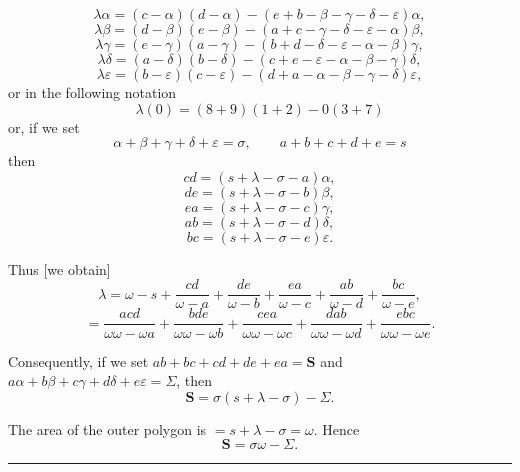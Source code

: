 
\[
\lambda\alpha=(c-\alpha)(d-\alpha)-(e+b-\beta-\gamma-\delta-\varepsilon)\alpha,
\]
\[
\lambda \beta=(d-\beta)(e-\beta)-(a+c-\gamma-\delta-\varepsilon-\alpha)\beta,
\]
\[
\lambda \gamma=(e-\gamma)(a-\gamma)-(b+d-\delta-\varepsilon-\alpha-\beta)\gamma,
\]
\[
\lambda \delta=(a-\delta)(b-\delta)-(c+e-\varepsilon-\alpha-\beta-\gamma)\delta,
\]
\[
\lambda \varepsilon=(b-\varepsilon)(c-\varepsilon)-(d+a-\alpha-\beta-\gamma-\delta)\varepsilon,
\]
or in the following notation
\[
\lambda(0)=(8+9)(1+2)-0(3+7)
\]
or, if we set
\[
\alpha+\beta+\gamma+\delta+\varepsilon=\sigma, \qquad a+b+c+d+e=s
\]
then
\[
cd=(s+\lambda-\sigma-a)\alpha,
\]
\[
de=(s+\lambda-\sigma-b)\beta,
\]
\[
ea=(s+\lambda-\sigma-c)\gamma,
\]
\[
ab=(s+\lambda-\sigma-d)\delta,
\]
\[
bc=(s+\lambda-\sigma-e)\varepsilon.
\]

Thus [we obtain]
\[
\lambda=\omega-s+\frac{cd}{\omega-a}+\frac{de}{\omega-b}+\frac{ea}{\omega-c}+\frac{ab}{\omega-d}+\frac{bc}{\omega-e},
\]
\[
=\frac{acd}{\omega\omega-\omega a}+\frac{bde}{\omega\omega-\omega b}+\frac{cea}{\omega\omega-\omega c}+\frac{dab}{\omega\omega-\omega d}+\frac{ebc}{\omega\omega-\omega e}.
\]

Consequently, if we set $ab+bc+cd+de+ea=\boldsymbol{S}$ and $a\alpha+b\beta+c\gamma+d\delta+e\varepsilon=\Sigma$, then
\[
\boldsymbol{S}=\sigma(s+\lambda-\sigma)-\Sigma.
\]

The area of the outer polygon is $=s+\lambda-\sigma=\omega$. Hence
\[
\boldsymbol{S}=\sigma\omega-\Sigma.
\]

\begin{center}\rule{3cm}{.4pt}\end{center}
